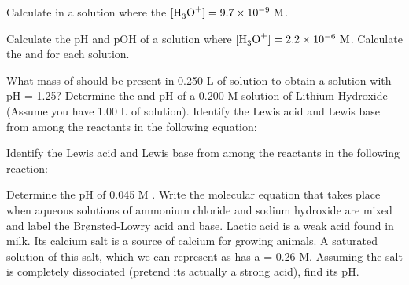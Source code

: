 \documentclass[addpoints,12pt]{exam}
\newcommand{\h}{\ce{[H3O^+]} }
\newcommand{\oh}{\ce{[OH^-]} }
\begin{document}
\begin{questions}
    \question[1] Calculate \oh in a solution where the $\h =9.7\times 10^{-9} \text{ M}$.
    \vspace{1.5in}
    
    \question[1] Calculate the pH and pOH of a solution where $\h =2.2\times 10^{-6} \text{ M}$.
\vspace{1.5in}
    \question[3] Calculate the \h and \oh for each solution.
        \vspace{3in}
    \question[1] What mass of  should be present in 0.250 L of solution to obtain a solution with pH = 1.25?
    \vspace{1.5in}
    \question[2] Determine the \h and pH of a 0.200 M solution of Lithium Hydroxide (Assume you have 1.00 L of solution).
    \vspace{1.5in}
    \question[1] Identify the Lewis acid and Lewis base from among the reactants in the following equation:
    \begin{center}
    \end{center}
    \vspace{1.0in}
    \question[1] Identify the Lewis acid and Lewis base from among the reactants in the following reaction:
    \begin{center}
    \end{center}
    \vspace{1.0in}
    \question[1] Determine the pH of 0.045 M .
    \vspace{1.5in}
    \question[1]Write the molecular equation that takes place when aqueous solutions of ammonium chloride and sodium hydroxide are mixed and label the Br\o nsted-Lowry acid and base.
    \vspace{1.5in}
    \question[1] Lactic acid is a weak acid found in milk.  Its calcium salt is a source of calcium for growing animals.  A saturated solution of this salt, which we can represent as  has a \ce{[Ca^2+]} = 0.26 M.  Assuming the salt is completely dissociated (pretend its actually a strong acid), find its pH.

\end{questions}
\end{document}
